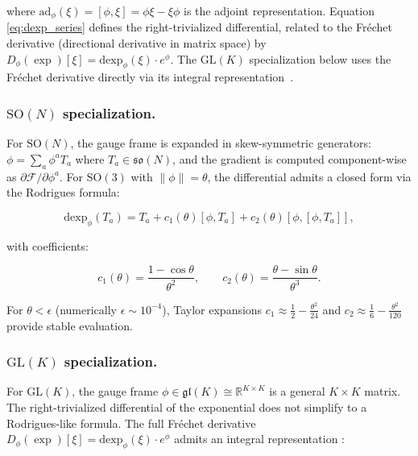 \documentclass[twoside,11pt]{article}
\begin{document}
where $\mathrm{ad}_\phi(\xi) = [\phi, \xi] = \phi\xi - \xi\phi$ is the adjoint representation. Equation \eqref{eq:dexp_series} defines the right-trivialized differential, related to the Fr\'{e}chet derivative (directional derivative in matrix space) by $D_\phi(\exp)[\xi] = \mathrm{dexp}_\phi(\xi) \cdot e^\phi$. The $\mathrm{GL}(K)$ specialization below uses the Fr\'{e}chet derivative directly via its integral representation~\citep[Ch.~10]{Higham2008}.

\subsubsection{$\mathrm{SO}(N)$ specialization.}

For $\mathrm{SO}(N)$, the gauge frame is expanded in skew-symmetric generators: $\phi = \sum_a \phi^a T_a$ where $T_a \in \mathfrak{so}(N)$, and the gradient is computed component-wise as $\partial \mathcal{F}/\partial \phi^a$. For $\mathrm{SO}(3)$ with $\|\phi\| = \theta$, the differential admits a closed form via the Rodrigues formula:

\begin{equation}
\mathrm{dexp}_\phi(T_a) = T_a + c_1(\theta)[\phi, T_a] + c_2(\theta)[\phi, [\phi, T_a]],
\label{eq:dexp_so3}
\end{equation}

with coefficients:

\begin{equation}
c_1(\theta) = \frac{1 - \cos\theta}{\theta^2}, \qquad c_2(\theta) = \frac{\theta - \sin\theta}{\theta^3}.
\end{equation}

For $\theta < \epsilon$ (numerically $\epsilon \sim 10^{-4}$), Taylor expansions $c_1 \approx \frac{1}{2} - \frac{\theta^2}{24}$ and $c_2 \approx \frac{1}{6} - \frac{\theta^2}{120}$ provide stable evaluation.

\subsubsection{$\mathrm{GL}(K)$ specialization.}

For $\mathrm{GL}(K)$, the gauge frame $\phi \in \mathfrak{gl}(K) \cong \mathbb{R}^{K \times K}$ is a general $K \times K$ matrix. The right-trivialized differential of the exponential does not simplify to a Rodrigues-like formula. The full Fr\'{e}chet derivative $D_\phi(\exp)[\xi] = \mathrm{dexp}_\phi(\xi) \cdot e^\phi$ admits an integral representation \citep[Eq.~10.15]{Higham2008}:
\end{document}
